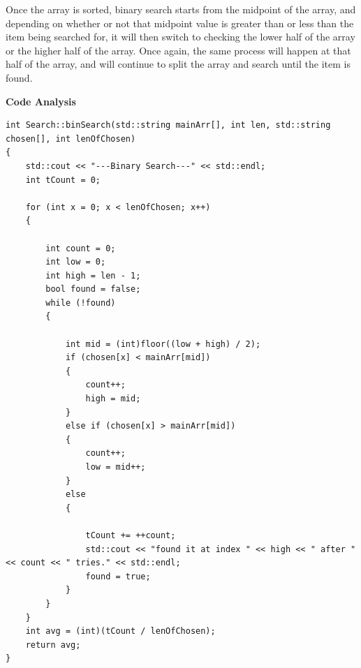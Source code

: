 \documentclass[letterpaper, 10pt]{article}
\begin{document}
Once the array is sorted, binary search starts from the midpoint of the array, and depending on whether or not that midpoint value is greater than or less than the item being searched for, it will then switch to checking the lower half of the array or the higher half of the array. Once again, the same process will happen at that half of the array, and will continue to split the array and search until the item is found.
\newpage
\begin{center}
  \textbf{Code Analysis}  
\end{center}

\begin{addmargin}[-5em]{1em}
\begin{small}
\begin{verbatim}
int Search::binSearch(std::string mainArr[], int len, std::string chosen[], int lenOfChosen)
{
	std::cout << "---Binary Search---" << std::endl;
	int tCount = 0;

	for (int x = 0; x < lenOfChosen; x++)
	{

		int count = 0;
		int low = 0;
		int high = len - 1;
		bool found = false;
		while (!found)
		{

			int mid = (int)floor((low + high) / 2);
			if (chosen[x] < mainArr[mid])
			{
				count++;
				high = mid;
			}
			else if (chosen[x] > mainArr[mid])
			{
				count++;
				low = mid++;
			}
			else
			{

				tCount += ++count;
				std::cout << "found it at index " << high << " after " << count << " tries." << std::endl;
				found = true;
			}
		}
	}
	int avg = (int)(tCount / lenOfChosen);
	return avg;
}

\end{verbatim}
\end{small}
\end{addmargin}
\end{document}
